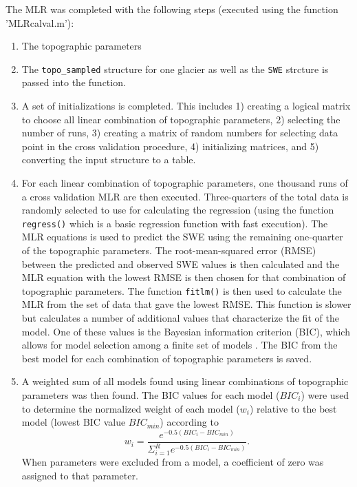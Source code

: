 \documentclass[12pt]{article}
\begin{document}
The MLR was completed with the following steps (executed using the function 'MLRcalval.m'):
\begin{enumerate}
\item The topographic parameters 

\item The \texttt{topo\_sampled} structure for one glacier as well as the \texttt{SWE} strcture is passed into the function.

\item A set of initializations is completed. This includes 1) creating a logical matrix to choose all linear combination of topographic parameters, 2) selecting the number of runs, 3) creating a matrix of random numbers for selecting data point in the cross validation procedure, 4) initializing matrices, and 5) converting the input structure to a table.

\item For each linear combination of topographic parameters, one thousand runs of a cross validation MLR are then executed. Three-quarters of the total data is randomly selected to use for calculating the regression (using the function \texttt{regress()} which is a basic regression function with fast execution). The MLR equations is used to predict the SWE using the remaining one-quarter of the topographic parameters. The root-mean-squared error (RMSE) between the predicted and observed SWE values is then calculated and the MLR equation with the lowest RMSE is then chosen for that combination of topographic parameters. The function \texttt{fitlm()} is then used to calculate the MLR from the set of data that gave the lowest RMSE. This function is slower but calculates a number of additional values that characterize the fit of the model. One of these values is the Bayesian information criterion (BIC), which allows for model selection among a finite set of models \citep{Burnham2004}. The BIC from the best model for each combination of topographic parameters is saved.

\item A weighted sum of all models found using linear combinations of topographic parameters was then found. The BIC values for each model ($BIC_i$) were used to determine the normalized weight of each model ($w_i$) relative to the best model (lowest BIC value $BIC_{min}$) according to \citep{Burnham2004}
\begin{equation}
w_i = \frac{e^{-0.5(BIC_i-BIC_{min})}}{\Sigma_{i=1}^R e^{-0.5(BIC_i-BIC_{min})}}.
\end{equation}
When parameters were excluded from a model, a coefficient of zero was assigned to that parameter. 


\end{enumerate}
\end{document}
